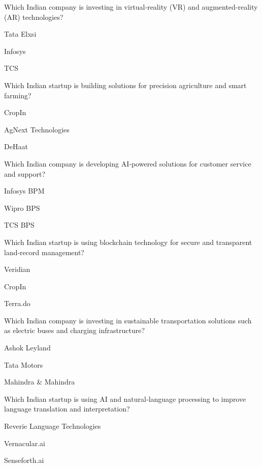 \begin{enhancedmcq}{Which Indian company is investing in virtual‑reality (VR) and augmented‑reality (AR) technologies?}
\item Tata Elxsi
\item Infosys
\item TCS

\end{enhancedmcq}
\begin{enhancedmcq}{Which Indian startup is building solutions for precision agriculture and smart farming?}
\item CropIn
\item AgNext Technologies
\item DeHaat

\end{enhancedmcq}
\begin{enhancedmcq}{Which Indian company is developing AI‑powered solutions for customer service and support?}
\item Infosys BPM
\item Wipro BPS
\item TCS BPS

\end{enhancedmcq}
\begin{enhancedmcq}{Which Indian startup is using blockchain technology for secure and transparent land‑record management?}
\item Veridian
\item CropIn
\item Terra.do

\end{enhancedmcq}
\begin{enhancedmcq}{Which Indian company is investing in sustainable transportation solutions such as electric buses and charging infrastructure?}
\item Ashok Leyland
\item Tata Motors
\item Mahindra & Mahindra

\end{enhancedmcq}
\begin{enhancedmcq}{Which Indian startup is using AI and natural‑language processing to improve language translation and interpretation?}
\item Reverie Language Technologies
\item Vernacular.ai
\item Senseforth.ai

\end{enhancedmcq}
